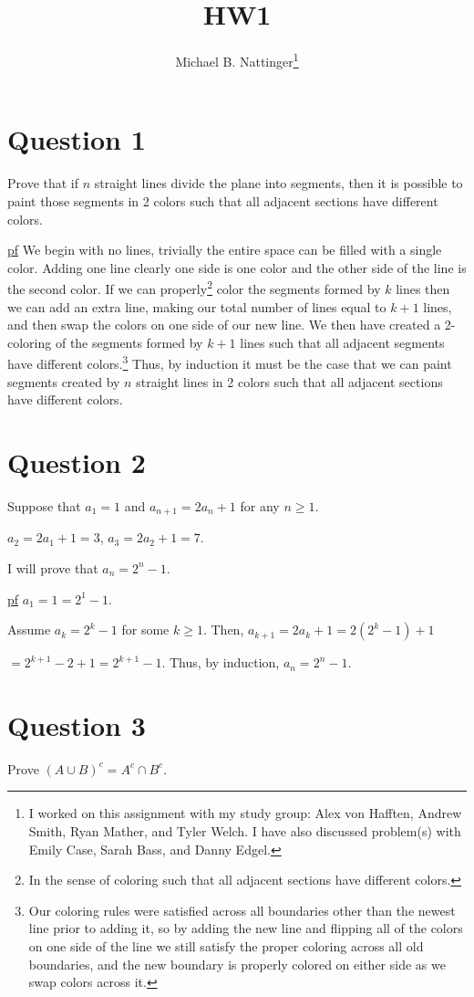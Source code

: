 \documentclass[11pt]{article} %
\title{HW1}
\author{Michael B. Nattinger\footnote{I worked on this assignment with my study group: Alex von Hafften, Andrew Smith, Ryan Mather, and Tyler Welch. I have also discussed problem(s) with Emily Case, Sarah Bass, and Danny Edgel.}}
\begin{document}
\maketitle

\section{Question 1}
Prove that if $n$ straight lines divide the plane into segments, then it is possible to paint those segments in 2 colors such that all adjacent sections have different colors.


\underline{pf} We begin with no lines, trivially the entire space can be filled with a single color. Adding one line clearly one side is one color and the other side of the line is the second color. If we can properly\footnote{In the sense of coloring such that all adjacent sections have different colors.} color the segments formed by $k$ lines then we can add an extra line, making our total number of lines equal to $k+1$ lines, and then swap the colors on one side of our new line. We then have created a 2-coloring of the segments formed by $k+1$ lines such that all adjacent segments have different colors.\footnote{Our coloring rules were satisfied across all boundaries other than the newest line prior to adding it, so by adding the new line and flipping all of the colors on one side of the line we still satisfy the proper coloring across all old boundaries, and the new boundary is properly colored on either side as we swap colors across it.} Thus, by induction it must be the case that we can paint segments created by $n$ straight lines in 2 colors such that all adjacent sections have different colors.  

\section{Question 2}
Suppose that $a_1 = 1$ and $a_{n+1} = 2a_n + 1 $ for any $n \geq 1 $.

$a_2 = 2a_1 +1 = 3$, $a_3 = 2a_2 +1 = 7$.

I will prove that $a_n = 2^n -1$.

\underline{pf} $a_1 = 1 = 2^1 - 1$.

Assume $a_k = 2^k - 1 $ for some $k \geq 1$. Then, $a_{k+1} = 2a_k +1 = 2\left(2^k - 1\right) +1$

$ = 2^{k+1} - 2 +1 = 2^{k+1} - 1$. Thus, by induction, $a_n = 2^n - 1$.

\section{Question 3}
Prove $\left(A \cup B \right) ^c = A^c \cap B^c$.
\end{document}
